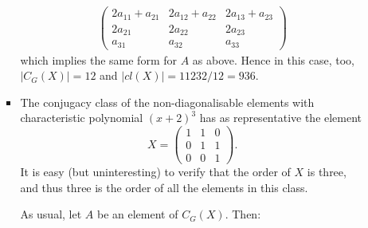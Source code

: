 \documentclass[11pt]{article} \usepackage{amssymb}
\begin{document}
\begin{enumerate}
\begin{enumerate}
\begin{itemize}
\begin{eqnarray*}
\begin{pmatrix}
            2a_{11}+a_{21}&2a_{12}+a_{22}  &2a_{13}+a_{23} \\ 
            2a_{21}&2a_{22}  &2a_{23} \\ 
            a_{31}&a_{32}  &a_{33} 
          \end{pmatrix}
        \end{eqnarray*}
        which implies the same form for $A$ as above. Hence in this case, too,
        $|C_G(X)|=12$ and $|cl(X)|=11232/12=936$.
      \item
        The conjugacy class of the non-diagonalisable elements with 
        characteristic polynomial
        $(x+2)^3$ has as representative the element
        \begin{equation*}
          X=
          \begin{pmatrix}
            1&1  &0 \\ 
            0&1  &1 \\ 
            0&0  &1 
          \end{pmatrix}.
        \end{equation*}
        It is easy (but uninteresting) to verify that the order of $X$ is
        three, and thus three is the order of all the elements in this class.
        
        As usual, let $A$ be an element of $C_G(X)$. Then:
        

\end{itemize}
\end{enumerate}
\end{enumerate}
\end{document}
